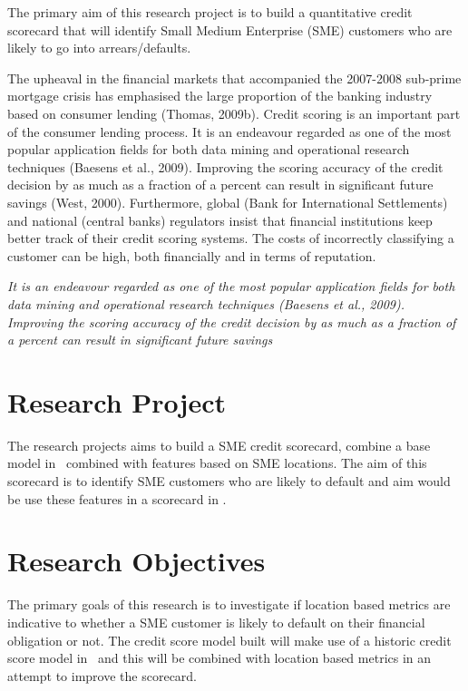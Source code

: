 The primary aim of this research project is to build a quantitative credit scorecard that will identify Small Medium Enterprise (SME) customers who are likely to go into arrears/defaults.


The upheaval in the financial markets that accompanied the 2007-2008 sub-prime
mortgage crisis has emphasised the large proportion of the banking industry based
on consumer lending (Thomas, 2009b). Credit scoring is an important part of the
consumer lending process. It is an endeavour regarded as one of the most popular
application fields for both data mining and operational research techniques (Baesens
et al., 2009). Improving the scoring accuracy of the credit decision by as much as
a fraction of a percent can result in significant future savings (West, 2000). Furthermore,
global (Bank for International Settlements) and national (central banks)
regulators insist that financial institutions keep better track of their credit scoring
systems. The costs of incorrectly classifying a customer can be high, both financially
and in terms of reputation.


\textit{It is an endeavour regarded as one of the most popular
application fields for both data mining and operational research techniques (Baesens
et al., 2009). Improving the scoring accuracy of the credit decision by as much as
a fraction of a percent can result in significant future savings}

\section{Research Project}
The research projects aims to build a SME credit scorecard, combine a base model in \subjectname\ combined with features based on SME locations. The aim of this scorecard is to identify SME customers who are likely to default and aim would be use these features in a scorecard in \subjectname.



\section{Research Objectives}
The primary goals of this research is to investigate if location based metrics are indicative to whether a SME customer is likely to default on their financial obligation or not. The credit score model built will make use of a historic credit score model in \subjectname\ and this will be combined with location based metrics in an attempt to improve the scorecard. 
 
